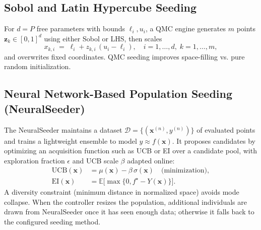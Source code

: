 \documentclass[12pt,a4paper]{article}
\begin{document}
    \subsection{Sobol and Latin Hypercube Seeding}
    For $d=P$ free parameters with bounds $\ell_i,u_i$, a QMC engine generates $m$ points $\mathbf{z}_k\in[0,1]^d$ using either Sobol or LHS, then scales
    \begin{equation}
        x_{k,i}\;=\;\ell_i + z_{k,i}\,(u_i-\ell_i),\quad i=1,\dots,d,\;k=1,\dots,m,
    \end{equation}
    and overwrites fixed coordinates. QMC seeding improves space-filling vs. pure random initialization.

    \subsection{Neural Network-Based Population Seeding (NeuralSeeder)}
    The NeuralSeeder maintains a dataset $\mathcal{D}=\{(\mathbf{x}^{(n)}, y^{(n)})\}$ of evaluated points and trains a lightweight ensemble to model $y\approx f(\mathbf{x})$. It proposes candidates by optimizing an acquisition function such as UCB or EI over a candidate pool, with exploration fraction $\epsilon$ and UCB scale $\beta$ adapted online:
    \begin{align}\label{eq:UCBEI}
        \text{UCB}(\mathbf{x}) &= \mu(\mathbf{x}) - \beta\,\sigma(\mathbf{x}) \quad \text{(minimization)},\\
        \text{EI}(\mathbf{x}) &= \mathbb{E}\big[\max\{0, f^{\star}-Y(\mathbf{x})\}\big].
    \end{align}
    A diversity constraint (minimum distance in normalized space) avoids mode collapse. When the controller resizes the population, additional individuals are drawn from NeuralSeeder once it has seen enough data; otherwise it falls back to the configured seeding method.
\end{document}
